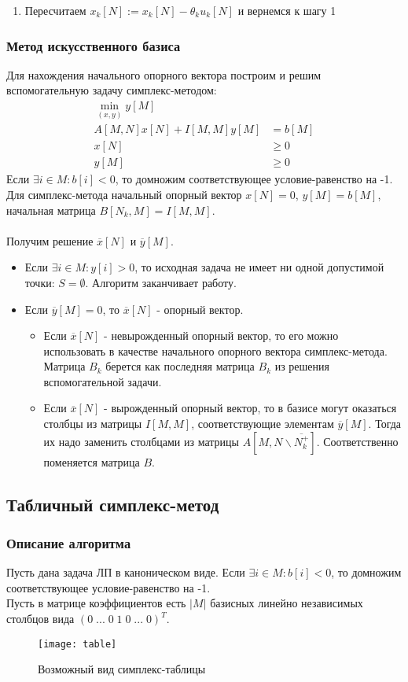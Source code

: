 \begin{enumerate}
	\item Пересчитаем $x_k[N]:=x_k[N]-\theta_k u_k[N]$ и вернемся к шагу 1
\end{enumerate}

\subsubsection{Метод искусственного базиса}
Для нахождения начального опорного вектора построим и решим вспомогательную задачу симплекс-методом:
\begin{align*} 
\min_{(x,y)} y[M]\\
A[M,N]x[N]+I[M,M]y[M]&= b[M] \\
x[N]&\geq 0 \\
y[M]&\geq 0
\end{align*}
Если $\exists i \in M: b[i]<0$, то домножим соответствующее условие-равенство на -1.\\
Для симплекс-метода начальный опорный вектор $x[N]=0$, $y[M]=b[M]$, начальная матрица $B[N_k,M]=I[M,M]$. \\
\\
Получим решение $\overline{x}[N]$ и $\overline{y}[M]$.
\begin{itemize}
	\item Если $\exists i \in M: y[i]>0$, то исходная задача не имеет ни одной допустимой точки: $S=\emptyset$. Алгоритм заканчивает работу.
	\item Если $\overline{y}[M]=0$, то $\overline{x}[N]$ - опорный вектор.
	\begin{itemize}
		\item Если $\overline{x}[N]$ - невырожденный опорный вектор, то его можно использовать в качестве начального опорного вектора симплекс-метода. Матрица $B_k$ берется как последняя матрица $B_k$ из решения вспомогательной задачи.
		\item Если $\overline{x}[N]$ - вырожденный опорный вектор, то в базисе могут оказаться столбцы из матрицы $I[M,M]$, соответствующие элементам $\overline{y}[M]$. Тогда их надо заменить столбцами из матрицы $A[M,N\backslash \overline{N_k^+}]$. Соответственно поменяется матрица $B$.
	\end{itemize}
\end{itemize}

\subsection{Табличный симплекс-метод}
\subsubsection{Описание алгоритма}
Пусть дана задача ЛП в каноническом виде. Если $\exists i \in M: b[i]<0$, то домножим соответствующее условие-равенство на -1.\\
Пусть в матрице коэффициентов есть $|M|$ базисных линейно независимых столбцов вида $(0\;...\;0\;1\;0\;...\;0)^T$.\\
\newpage
\begin{figure}[!htb]
    \centering
    \texttt{[image: table]}
    \caption{Возможный вид симплекс-таблицы}
    \label{fig:proof1}
\end{figure}

